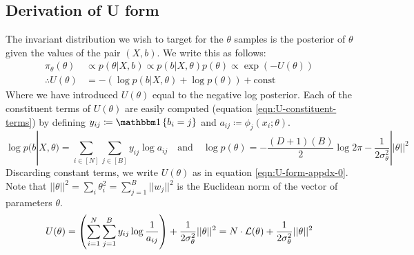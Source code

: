 \subsection{Derivation of U form}
\label{appdx:form-U}

The invariant distribution we wish to target for the $\theta$ samples is the posterior of $\theta$ given the values of the pair $(X, b)$. We write this as follows:
%
\begin{align}
	\pi_\theta(\theta) &\propto p(\theta | X, b) \propto p(b | X, \theta) p(\theta) \propto  \exp \left( - U(\theta) \right) \\
	\therefore U(\theta) &= - \left( \log p(b | X, \theta) + \log p(\theta) \right) + \textrm{const}
\end{align}
%
Where we have introduced $U(\theta)$ equal to the negative log posterior. Each of the constituent terms of $U(\theta)$ are easily computed (equation \ref{eqn:U-constituent-terms}) by defining $y_{ij} \coloneqq \one \left\{ b_i = j \right\}$ and $a_{ij} \coloneqq \phi_j(x_i; \theta)$.
%
\begin{equation}
	\log p(b | X, \theta) = \sum_{i \in [N]} \sum_{j \in [B]} y_{ij} \log a_{ij}  \quad \textrm{and} \quad
	\log p(\theta) = -\frac{(D+1)(B)}{2} \log 2\pi - \frac{1}{2 \sigma_\theta^2} || \theta ||^2
	\label{eqn:U-constituent-terms}
\end{equation}
%
Discarding constant terms, we write $U(\theta)$ as in equation \ref{eqn:U-form-appdx-0}. Note that $||\theta||^2 = \sum_{i} \theta_{i}^2 = \sum_{j=1}^{B} ||w_j||^2$ is the Euclidean norm of the vector of parameters $\theta$.
%
\begin{equation}
	U(\theta) = \left( \sum_{i=1}^{N} \sum_{j=1}^{B} y_{ij} \log \frac{1}{a_{ij}} \right)
	+ \frac{1}{2\sigma_\theta^2} ||\theta||^2 = N \cdot \mathcal{L}(\theta) + \frac{1}{2\sigma_\theta^2} ||\theta||^2
	\label{eqn:U-form-appdx-0}
\end{equation}
%

